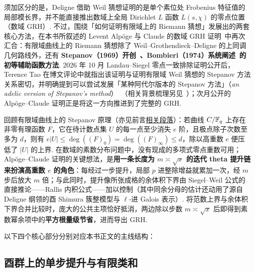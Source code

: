 须加区分的是，Deligne 借助 Weil 猜想证明的是单个素位处 Frobenius 特征值的局部模长界，并不能直接推出数域上全局 Dirichlet $L$ 函数 $L(s,\chi)$ 的零点位置（数域 GRH）. 不过，围绕「如何证明有限域上的 Riemann 猜想」发展出的两套核心方法，在本书所叙述的 Levent Alpöge 与 Claude 的数域 GRH 证明~\cite{Alpoge2026}中再次汇合：有限域曲线上的 Riemann 猜想除了 Weil--Grothendieck--Deligne 的上同调几何路线外，还有 \textbf{Stepanov（1969）开创~\cite{Stepanov1969}、Bombieri（1974）系统阐述~\cite{Bombieri1974}的初等辅助函数方法}. 2026 年 10 月 Landau--Siegel 零点一致排除证明公开后，Terence Tao 在博文评论中就指出该证明与证明有限域 Weil 猜想的 Stepanov 方法关系密切，并明确提到可以尝试发展「某种阿代尔版本的 Stepanov 方法」（\emph{an adelic version of Stepanov's method}）~\cite{Tao2026SiegelComment}（相关背景梳理另见~\cite{SIYZ2026}）；次月公开的 Alpöge--Claude 证明正是将这一方向推进到了完整的 GRH.

回顾有限域曲线上的 Stepanov 原理（亦见前言\hyperref[par:stepanov-method]{相关段落}）：若曲线 $C/\mathbb{F}_q$ 上存在非零有理函数 $F$，它在待计数点集 $U$ 的每一点至少消失 $e$ 阶，且极点除子次数至多为 $d$，则有 $e|U|\le\deg((F)_0)=\deg((F)_\infty)\le d$，除以高重数 $e$ 便压低了 $|U|$ 的上界. 在数域的素数分布问题中，没有现成的多项式零点重数可用；Alpöge--Claude 证明的关键想法，是\textbf{用一条长度为 $m\asymp\sqrt{x}$ 的迭代 theta 提升链来扮演高重数 $e$ 的角色}：每经过一步提升，局部 $p$ 进整除增益就累加一次，经 $m$ 步后放大 $m$ 倍；与此同时，提升像所张成格的余体积下界由 Siegel--Weil 公式的直接推论——Rallis 内积公式——加以控制（其中同余分母的估计还动用了源自 Deligne 纲领的酉 Shimura 簇整模型与 $\ell$-进 Galois 表示）. 将范数上界与余体积下界合并比较时，庞大的公共主项恰好抵消，两边除以步数 $m\asymp\sqrt{x}$ 后即得到素数幂余项中的\textbf{平方根量级节省}，进而导出 GRH.

以下四个核心部分分别对应本书正文的主线结构：

\subsection{酉群上的单步提升与有限类和}

